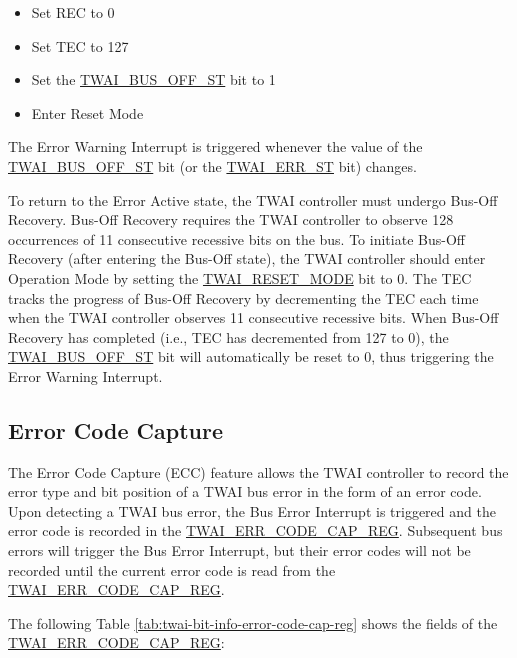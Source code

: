 \documentclass[main\_\_EN.tex]{subfiles}
\begin{document}
\begin{itemize}
    \item Set REC to 0
    \item Set TEC to 127
    \item Set the \hyperref[fielddesc:TWAIBUSOFFST]{TWAI\_BUS\_OFF\_ST} bit to 1
    \item Enter Reset Mode
\end{itemize}

The Error Warning Interrupt is triggered whenever the value of the \hyperref[fielddesc:TWAIBUSOFFST]{TWAI\_BUS\_OFF\_ST} bit (or the \hyperref[fielddesc:TWAIERRST]{TWAI\_ERR\_ST} bit) changes.

To return to the Error Active state, the TWAI controller must undergo Bus-Off Recovery. Bus-Off Recovery requires the TWAI controller to observe 128 occurrences of 11 consecutive recessive bits on the bus. To initiate Bus-Off Recovery (after entering the Bus-Off state), the TWAI controller should enter Operation Mode by setting the \hyperref[fielddesc:TWAIRESETMODE]{TWAI\_RESET\_MODE} bit to 0.
The TEC tracks the progress of Bus-Off Recovery by decrementing the TEC each time when the TWAI controller observes 11 consecutive recessive bits. When Bus-Off Recovery has completed (i.e., TEC has decremented from 127 to 0), the \hyperref[fielddesc:TWAIBUSOFFST]{TWAI\_BUS\_OFF\_ST} bit will automatically be reset to 0, thus triggering the Error Warning Interrupt.


\subsection{Error Code Capture}

The Error Code Capture (ECC) feature allows the TWAI controller to record the error type and bit position of a TWAI bus error in the form of an error code. Upon detecting a TWAI bus error, the Bus Error Interrupt is triggered and the error code is recorded in the \hyperref[regdesc:TWAIERRCODECAPREG]{TWAI\_ERR\_CODE\_CAP\_REG}. Subsequent bus errors will trigger the Bus Error Interrupt, but their error codes will not be recorded until the current error code is read from the \hyperref[regdesc:TWAIERRCODECAPREG]{TWAI\_ERR\_CODE\_CAP\_REG}.

The following Table \ref{tab:twai-bit-info-error-code-cap-reg} shows the fields of the \hyperref[regdesc:TWAIERRCODECAPREG]{TWAI\_ERR\_CODE\_CAP\_REG}:
\end{document}
